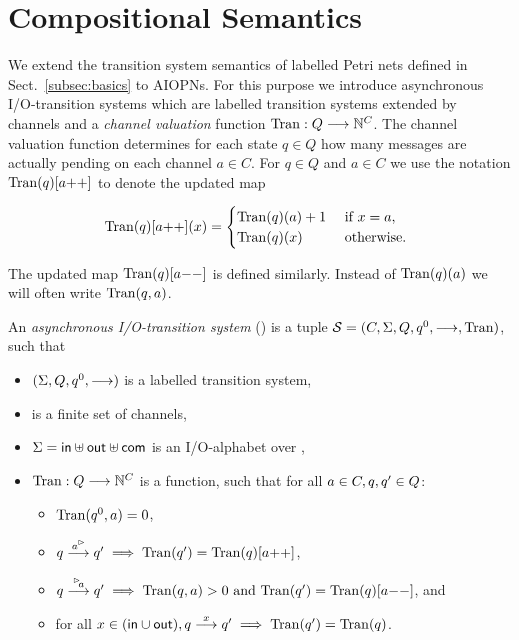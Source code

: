 
\section{Compositional Semantics}
\label{sec:semantics}

We extend the transition system semantics of labelled Petri nets defined in Sect.~\ref{subsec:basics} to AIOPNs.
For this purpose we introduce asynchronous I/O-transition systems which are
labelled transition systems extended by channels and a \emph{channel valuation} function $\mathrm{Tran}: Q  \stackrel{}{\longrightarrow} \mathbb{N}^{C}$.
The channel valuation function determines for each state $q \in Q$ how many messages are actually pending
on each channel $a \in C$. 
For $q \in Q$ and $a \in C$ we use the notation $\mathrm{Tran}(q)[a\mathrm{++}]$ to denote the updated map

\[
    \mathrm{Tran}(q)[a\mathrm{++}](x) = \begin{cases}
        \mathrm{Tran}(q)(a)+1 &\text{ if } x = a,\\
        \mathrm{Tran}(q)(x) &\text{ otherwise. }
    \end{cases}
\]

The updated map $\mathrm{Tran}(q)[a\mathrm{--}]$ is defined similarly. Instead of $\mathrm{Tran}(q)(a)$ we will often write $\mathrm{Tran}(q,a)$.

\begin{definition}\label{def:aiots}
    An \emph{asynchronous I/O-transition system} (\AIOTS) is a tuple $\mathcal{S} = (C, \Sigma,Q,q^0,\stackrel{}{\longrightarrow},\mathrm{Tran})$, such that
    \begin{itemize}
        \item $(\Sigma, Q, q^0, \stackrel{}{\longrightarrow})$ is a labelled transition system, 
        \item \chan is a finite set of channels,
        \item $\Sigma = \mathsf{in} \uplus \mathsf{out} \uplus \mathsf{com}$ is an I/O-alphabet over \chan,
        \item $\mathrm{Tran}: Q  \stackrel{}{\longrightarrow} \mathbb{N}^{C}$ is a function, such that for all $a \in C, q,q' \in Q$:
        \begin{itemize}
            \item $\mathrm{Tran}(q^0,a) = 0$,
            \item $q \goes{\outact{a}} q' \implies \val(q') = \val(q)[a\mathrm{++}]$,
            \item $q \goes{\inact{a}} q' \implies \val(q,a) > 0 
            \text{ and } \val(q') = \val(q)[a\mathrm{--}]$, and
            \item for all $x \in (\mathsf{in} \cup \mathsf{out}), q \stackrel{x}{\longrightarrow} q' \implies \mathrm{Tran}(q') = \mathrm{Tran}(q)$. 
        \end{itemize}
    \end{itemize}
\end{definition}

